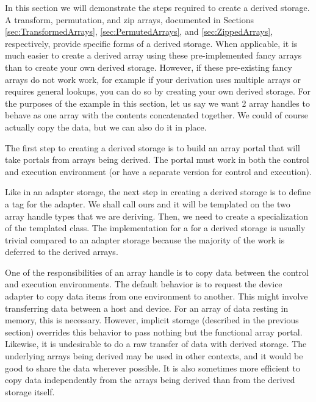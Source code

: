 In this section we will demonstrate the steps required to create a derived
storage. A transform, permutation, and zip arrays, documented in Sections
\ref{sec:TransformedArrays}, \ref{sec:PermutedArrays}, and
\ref{sec:ZippedArrays}, respectively, provide specific forms of a derived
storage. When applicable, it is much easier to create a derived array using
these pre-implemented fancy arrays than to create your own derived storage.
However, if these pre-existing fancy arrays do not work work, for example
if your derivation uses multiple arrays or requires general lookups, you
can do so by creating your own derived storage. For the purposes of the
example in this section, let us say we want 2 array handles to behave as
one array with the contents concatenated together. We could of course
actually copy the data, but we can also do it in place.

The first step to creating a derived storage is to build an array portal
that will take portals from arrays being derived. The portal must work in
both the control and execution environment (or have a separate version for
control and execution).


Like in an adapter storage, the next step in creating a derived storage
is to define a tag for the adapter. We shall call ours
 and it will be templated on
the two array handle types that we are deriving. Then, we need to create a
specialization of the templated 
class. The implementation for a  for
a derived storage is usually trivial compared to an adapter storage
because the majority of the work is deferred to the derived arrays.


One of the responsibilities of an array handle is to copy data between the
control and execution environments. The default behavior is to request the
device adapter to copy data items from one environment to another. This
might involve transferring data between a host and device. For an array of
data resting in memory, this is necessary. However, implicit storage
(described in the previous section) overrides this behavior to pass nothing
but the functional array portal. Likewise, it is undesirable to do a raw
transfer of data with derived storage. The underlying arrays being
derived may be used in other contexts, and it would be good to share the
data wherever possible. It is also sometimes more efficient to copy data
independently from the arrays being derived than from the derived storage
itself.

